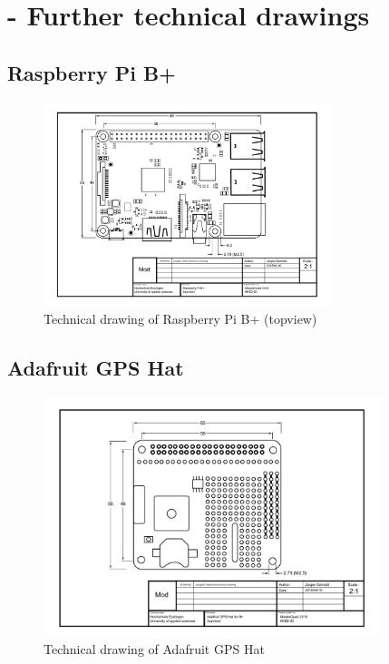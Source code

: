 \chapter{- Further technical drawings}
\label{sec:a-techDraw}

\section{Raspberry Pi B+}
\label{sec:goals:rpib}
\begin{figure}[H]
    \centering
    \includegraphics[angle=90,width=0.75\textwidth]{fig/ch-zz-appendix/A-techDraw/A4_tech_draw_topview_rpi}
    \caption{Technical drawing of Raspberry Pi B+ (topview)}
    \label{fig:parts:rpi_topview}
\end{figure}

\newpage
\section{Adafruit GPS Hat}
\label{sec:goals:gpshat}
\begin{figure}[H]
    \centering
    \includegraphics[angle=90,width=0.88\textwidth]{fig/ch-zz-appendix/A-techDraw/A4_tech_draw_topview_gpshat}
    \caption{Technical drawing of Adafruit GPS Hat}
    \label{fig:parts:gps_topview}
\end{figure}

